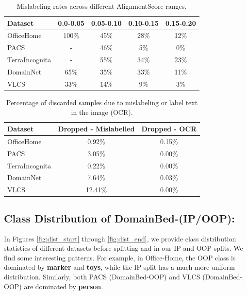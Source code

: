 \documentclass{article} %
\begin{document}
\begin{table}[t]
    \centering
    \caption{Mislabeling rates across different AlignmentScore ranges.}
    \begin{tabular}{lcccc}
        \toprule
        \textbf{Dataset} & 0.0-0.05 & 0.05-0.10 & 0.10-0.15 & 0.15-0.20 \\
        \midrule
        OfficeHome     & 100\% & 45\% & 28\% & 12\% \\
        PACS           & -     & 46\% & 5\%  & 0\%  \\
        TerraIncognita & -     & 55\% & 34\% & 23\% \\
        DomainNet      & 65\%  & 35\% & 33\% & 11\% \\
        VLCS           & 33\%  & 14\% & 9\%  & 3\%  \\
        \bottomrule
    \end{tabular}
    \label{table:mislabel}
\end{table}

\begin{table}[t]
    \caption{Percentage of discarded samples due to mislabeling or label text in the image (OCR).}
    \centering
    \begin{tabular}{lcc}
        \toprule
        \textbf{Dataset} & \textbf{Dropped - Mislabelled} & \textbf{Dropped - OCR} \\
        \midrule
        OfficeHome     & 0.92\%  & 0.15\% \\
        PACS           & 3.05\%  & 0.00\% \\
        TerraIncognita & 0.22\%  & 0.00\% \\
        DomainNet      & 7.64\%  & 0.03\% \\
        VLCS           & 12.41\% & 0.00\% \\
        \bottomrule
    \end{tabular}
    \label{table:discard}
\end{table}

\subsection{Class Distribution of DomainBed-(IP/OOP):}

In Figures \ref{fig:dist_start} through \ref{fig:dist_end}, we provide class distribution statistics of different datasets before splitting and in our IP and OOP splits. We find some interesting patterns. For example, in Office-Home, the OOP class is dominated by \textbf{marker} and \textbf{toys}, while the IP split has a much more uniform distribution.  Similarly, both PACS (DomainBed-OOP) and VLCS (DomainBed-OOP) are dominated by \textbf{person}. 
\end{document}
